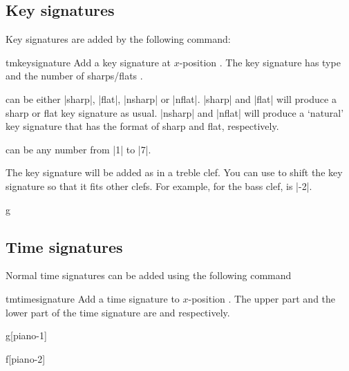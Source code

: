 \documentclass[11pt,a4paper]{ltxdoc}
\begin{document}
\subsection{Key signatures}\label{sec:signatures:key}
Key signatures are added by the following command:
\begin{docCommand}{tmkeysignature}{}
  Add a key signature at $x$-position . The key signature has type 
   and the number of \mbox{sharps/flats} .

   can be either |sharp|, |flat|, |nsharp| or |nflat|. |sharp| and 
  |flat| will produce a sharp or flat key signature as usual. |nsharp| and 
  |nflat| will produce a `natural' key signature that has the format of sharp and 
  flat, respectively.
  
   can be any number from |1| to |7|.

  The key signature will be added as in a treble clef. You can use  
  to shift the key signature so that it fits other clefs. For example, for the 
  bass clef,  is |-2|.
\end{docCommand}
\begin{dispExample}
\begin{tmsinglestaff}
  \begin{tmstaff}{g}
  \end{tmstaff}
\end{tmsinglestaff}
\end{dispExample}
\subsection{Time signatures}\label{sec:signatures:time}
Normal time signatures can be added using the following command
\begin{docCommand}{tmtimesignature}{}
  Add a time signature to $x$-position . The upper part and the lower 
  part of the time signature are  and  respectively.
\end{docCommand}
\begin{dispExample}
\begin{tmmultiplestaves}%
  \begin{tmstaff}{g}[piano-1]
  \end{tmstaff}%
  \begin{tmstaff}{f}[piano-2]
  \end{tmstaff}%
\end{tmmultiplestaves}
\end{dispExample}
\end{document}
